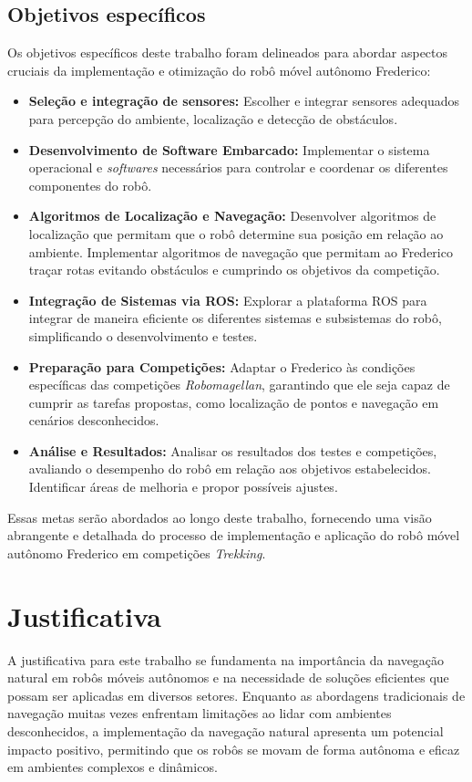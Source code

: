 \subsection{Objetivos específicos}
Os objetivos específicos deste trabalho foram delineados para abordar aspectos cruciais da implementação e otimização do robô móvel autônomo Frederico:
\begin{itemize}
    \item \textbf{Seleção e integração de sensores:} Escolher e integrar sensores adequados para percepção do ambiente, localização e detecção de obstáculos.
    \item \textbf{Desenvolvimento de Software Embarcado:} Implementar o sistema operacional e \textit{softwares} necessários para controlar e coordenar os diferentes componentes do robô.
    \item \textbf{Algoritmos de Localização e Navegação:} Desenvolver algoritmos de localização que permitam que o robô determine sua posição em relação ao ambiente. Implementar algoritmos de navegação que permitam ao Frederico traçar rotas evitando obstáculos e cumprindo os objetivos da competição.
    \item \textbf{Integração de Sistemas via ROS:} Explorar a plataforma ROS para integrar de maneira eficiente os diferentes sistemas e subsistemas do robô, simplificando o desenvolvimento e testes.
    \item \textbf{Preparação para Competições:} Adaptar o Frederico às condições específicas das competições \textit{Robomagellan}, garantindo que ele seja capaz de cumprir as tarefas propostas, como localização de pontos e navegação em cenários desconhecidos.
    \item \textbf{Análise e Resultados:} Analisar os resultados dos testes e competições, avaliando o desempenho do robô em relação aos objetivos estabelecidos. Identificar áreas de melhoria e propor possíveis ajustes.
\end{itemize}

Essas metas serão abordados ao longo deste trabalho, fornecendo uma visão abrangente e detalhada do processo de implementação e aplicação do robô móvel autônomo Frederico em competições \textit{Trekking}.


\section{\textbf{Justificativa}}

A justificativa para este trabalho se fundamenta na importância da navegação natural em robôs móveis autônomos e na necessidade de soluções eficientes que possam ser aplicadas em diversos setores. Enquanto as abordagens tradicionais de navegação muitas vezes enfrentam limitações ao lidar com ambientes desconhecidos, a implementação da navegação natural apresenta um potencial impacto positivo, permitindo que os robôs se movam de forma autônoma e eficaz em ambientes complexos e dinâmicos.

